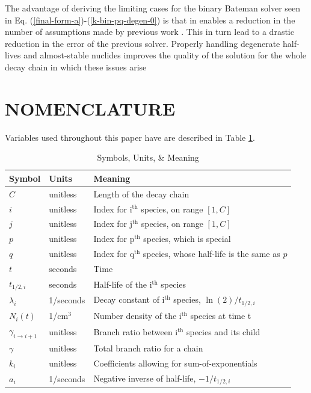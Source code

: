 \documentclass[letterpaper]{physor2018}
\newcommand{\ith}{i$^{\mathrm{th}}$\xspace}
\newcommand{\jth}{j$^{\mathrm{th}}$\xspace}
\newcommand{\pth}{p$^{\mathrm{th}}$\xspace}
\newcommand{\qth}{q$^{\mathrm{th}}$\xspace}
\begin{document}
The advantage of deriving the limiting cases for the binary Bateman solver
seen in Eq. (\ref{final-form-a})-(\ref{k-bin-pq-degen-0}) is that in enables
a reduction in the number of assumptions made by previous work
\cite{scopatz2015decay}. This in turn lead to a drastic reduction in the
error of the previous solver. Properly handling degenerate half-lives and
almost-stable nuclides improves the quality of the solution for the whole
decay chain in which these issues arise

\section*{NOMENCLATURE}
\label{sec-nomen}

Variables used throughout this paper have are described in Table \ref{nomenclature}.

\begin{table}[!htb]
\centering
\caption{Symbols, Units, \& Meaning}
\label{nomenclature}
\begin{tabular}{|l|l|l|}
\hline
\textbf{Symbol} & \textbf{Units} & \textbf{Meaning} \\
\hline
$C$                  & unitless  & Length of the decay chain \\
$i$                  & unitless  & Index for \ith species, on range $[1, C]$ \\
$j$                  & unitless  & Index for \jth species, on range $[1, C]$ \\
$p$                  & unitless  & Index for \pth species, which is special \\
$q$                  & unitless  & Index for \qth species, whose half-life is the same as $p$ \\
$t$                  & seconds   & Time \\
$t_{1/2,i}$          & seconds   & Half-life of the \ith species \\
$\lambda_i$          & 1/seconds & Decay constant of \ith species, $\ln(2)/t_{1/2,i}$ \\
$N_i(t)$             & 1/cm$^3$  & Number density of the \ith species at time t \\
$\gamma_{i \to i+1}$ & unitless  & Branch ratio between \ith species and its child \\
$\gamma$             & unitless  & Total branch ratio for a chain \\
$k_i$                & unitless  & Coefficients allowing for sum-of-exponentials \\
$a_i$                & 1/seconds & Negative inverse of half-life, $-1/t_{1/2,i}$ \\
\hline
\end{tabular}
\end{table}

\setlength{\baselineskip}{12pt}


\end{document}
